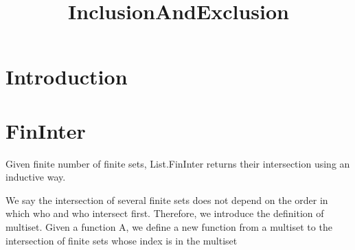 \title{InclusionAndExclusion}




\maketitle


\tableofcontents

\nocite{*} %

\section{Introduction}


\section{FinInter}

\begin{definition}\label{List.FinInter}
  \leanok
          Given finite number of finite sets, List.FinInter returns their intersection using an inductive way.
\end{definition}

\begin{lemma}\label{List.eq_FinInter}

\end{lemma}

\begin{definition}\label{Multiset.FinInter}
          We say the intersection of several finite sets does not depend on the order in which who and who intersect first. Therefore, we introduce the definition of multiset. Given a function A, we define a new function from a multiset to the intersection of finite sets whose index is in the multiset
\end{definition}

\begin{lemma}\label{Multiset.eq_FinInter}
\end{lemma}

\begin{definition}\label{FinInter₀}

\end{definition}


